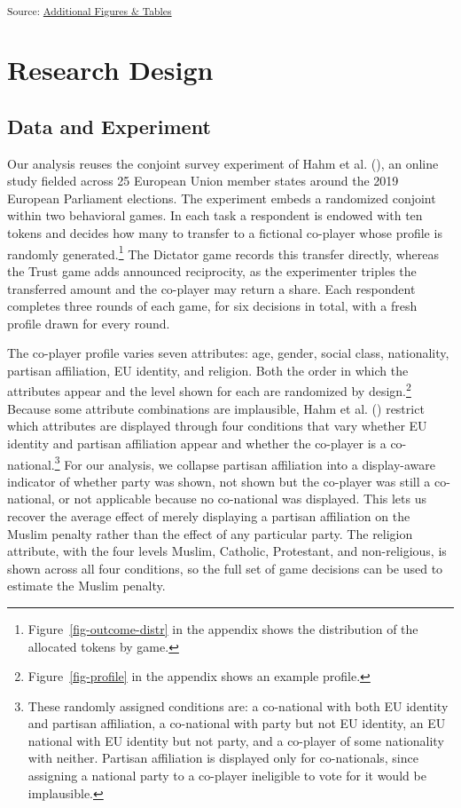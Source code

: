 \documentclass[
  10pt,
  a4paper,
  DIV=11,
  numbers=noendperiod]{scrartcl}
\begin{document}
\textsubscript{Source:
\href{https://dertristan.github.io/MBEU25/code/09_additional_figs_tables-preview.html\#cell-tbl-diff-in-means}{Additional
Figures \& Tables}}

\section{Research Design}\label{sec-design}

\subsection{Data and Experiment}\label{data-and-experiment}

Our analysis reuses the conjoint survey experiment of Hahm et al.
(), an online study fielded across
25 European Union member states around the 2019 European Parliament
elections. The experiment embeds a randomized conjoint within two
behavioral games. In each task a respondent is endowed with ten tokens
and decides how many to transfer to a fictional co-player whose profile
is randomly generated.\footnote{Figure~\ref{fig-outcome-distr} in the
  appendix shows the distribution of the allocated tokens by game.} The
Dictator game records this transfer directly, whereas the Trust game
adds announced reciprocity, as the experimenter triples the transferred
amount and the co-player may return a share. Each respondent completes
three rounds of each game, for six decisions in total, with a fresh
profile drawn for every round.

The co-player profile varies seven attributes: age, gender, social
class, nationality, partisan affiliation, EU identity, and religion.
Both the order in which the attributes appear and the level shown for
each are randomized by design.\footnote{Figure~\ref{fig-profile} in the
  appendix shows an example profile.} Because some attribute
combinations are implausible, Hahm et al.
() restrict which attributes are
displayed through four conditions that vary whether EU identity and
partisan affiliation appear and whether the co-player is a
co-national.\footnote{These randomly assigned conditions are: a
  co-national with both EU identity and partisan affiliation, a
  co-national with party but not EU identity, an EU national with EU
  identity but not party, and a co-player of some nationality with
  neither. Partisan affiliation is displayed only for co-nationals,
  since assigning a national party to a co-player ineligible to vote for
  it would be implausible.} For our analysis, we collapse partisan
affiliation into a display-aware indicator of whether party was shown,
not shown but the co-player was still a co-national, or not applicable
because no co-national was displayed. This lets us recover the average
effect of merely displaying a partisan affiliation on the Muslim penalty
rather than the effect of any particular party. The religion attribute,
with the four levels Muslim, Catholic, Protestant, and non-religious, is
shown across all four conditions, so the full set of game decisions can
be used to estimate the Muslim penalty.
\end{document}
